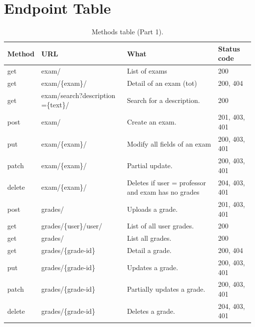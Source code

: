 \documentclass[11pt]{article}
\begin{document}
\section{Endpoint Table}
\begin{table}[h!]
\caption{Methods table (Part 1).}
\centering
\begin{tabular}{lp{4cm}p{5.5cm}l}
\hline
Method & URL & What & Status code\\
\hline
get & exam/ & List of exams & 200\\
get & exam/\{exam\}/ & Detail of an exam (tot) & 200, 404\\
get & exam/search?description =\{text\}/ & Search for a description. & 200\\
post & exam/ & Create an exam. & 201, 403, 401\\
put & exam/\{exam\}/ & Modify  all fields of an exam & 200, 403, 401\\
patch & exam/\{exam\}/ & Partial update. & 200, 403, 401\\
delete & exam/\{exam\}/ & Deletes if user = professor and exam has no grades & 204, 403, 401\\
\hline
post & grades/ & Uploads a grade. & 201, 403, 401\\
get & grades/\{user\}/user/ & List of all user grades. & 200\\
get & grades/ & List all grades. & 200\\
get & grades/\{grade-id\} & Detail a grade. & 200, 404\\
put & grades/\{grade-id\} & Updates a grade. & 200, 403, 401\\
patch & grades/\{grade-id\} & Partially updates a grade. & 200, 403, 401\\
delete & grades/\{grade-id\} & Deletes a grade. & 204, 403, 401\\
\hline
\end{tabular}
\end{table}
\end{document}
